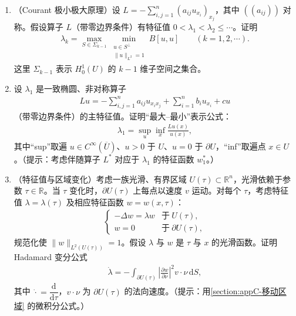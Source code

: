 \documentclass[../../main.tex]{subfiles}
\begin{document}
\begin{enumerate}
\item （Courant 极小极大原理）设 $L=-\sum_{i,j=1}^{n}(a_{ij}u_{x_{i}})_{x_{j}}$，其中 $((a_{ij}))$ 对称。假设算子 $L$（带零边界条件）有特征值 $0<\lambda_{1}<\lambda_{2}\leqslant\cdots$。证明
\begin{align*}
\lambda_{k}=\max_{S\in\Sigma_{k-1}}\min_{\substack{u\in S^{\perp}\\ \|u\|_{L^{2}}=1}}B[u,u]\qquad (k=1,2,\cdots).
\end{align*}
这里 $\Sigma_{k-1}$ 表示 $H^{1}_{0}(U)$ 的 $k-1$ 维子空间之集合。

\item 设 $\lambda_{1}$ 是一致椭圆、非对称算子
\begin{align*}
Lu=-\sum_{i,j=1}^{n}a_{ij}u_{x_{i}x_{j}}+\sum_{i=1}^{n}b_{i}u_{x_{i}}+cu
\end{align*}
（带零边界条件）的主特征值。证明“最大--最小”表示公式：
\begin{align*}
\lambda_{1}=\sup_{u}\inf_{x}\frac{Lu(x)}{u(x)},
\end{align*}
其中“sup”取遍 $u\in C^{\infty}(\overline{U})$、$u>0$ 于 $U$、$u=0$ 于 $\partial U$，“inf”取遍点 $x\in U$。（提示：考虑伴随算子 $L^{*}$ 对应于 $\lambda_{1}$ 的特征函数 $w_{1}^{*}$。）

\item （特征值与区域变化）考虑一族光滑、有界区域 $U(\tau)\subset\mathbb{R}^{n}$，光滑依赖于参数 $\tau\in\mathbb{R}$。当 $\tau$ 变化时，$\partial U(\tau)$ 上每点以速度 $v$ 运动。对每个 $\tau$，考虑特征值 $\lambda=\lambda(\tau)$ 及相应特征函数 $w=w(x,\tau)$：
\begin{align*}
\begin{cases}
-\Delta w=\lambda w & \text{于}\ U(\tau),\\
w=0 & \text{于}\ \partial U(\tau),
\end{cases}
\end{align*}
规范化使 $\|w\|_{L^{2}(U(\tau))}=1$。假设 $\lambda$ 与 $w$ 是 $\tau$ 与 $x$ 的光滑函数。证明 Hadamard 变分公式
\begin{align*}
\dot{\lambda}=-\int_{\partial U(\tau)}\left|\frac{\partial w}{\partial\nu}\right|^{2}v\cdot\nu\,\mathrm{d}S,
\end{align*}
其中 $\dot{\cdot}=\dfrac{\mathrm{d}}{\mathrm{d}\tau}$，$v\cdot\nu$ 为 $\partial U(\tau)$ 的法向速度。（提示：用\cref{section:appC-移动区域} 的微积分公式。）


\end{enumerate}
\end{document}
